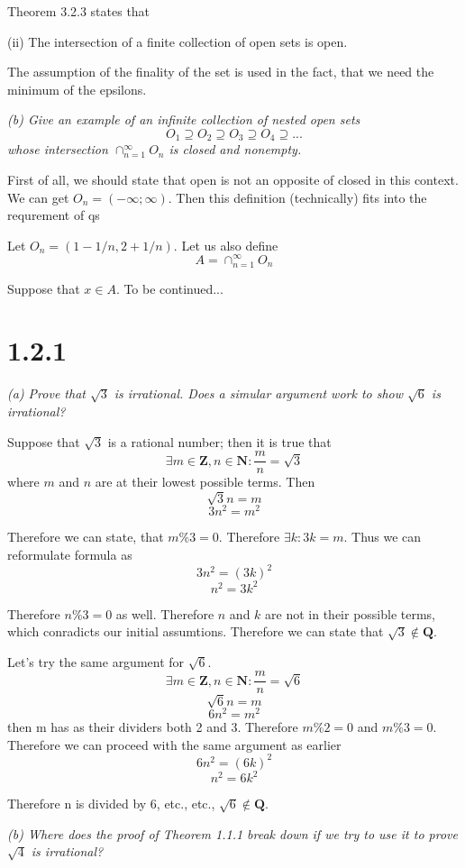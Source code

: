 \documentclass[11pt,oneside,titlepage]{article}
\begin{document}
Theorem 3.2.3 states that

(ii) The intersection of a finite collection of open sets is open.

The assumption of the finality of the set is used in the fact, that we need
the minimum of the epsilons.

\textit{(b) Give an example of an infinite collection of nested open sets}
$$ O_1 \supseteq O_2 \supseteq O_3 \supseteq O_4 \supseteq ... $$
\textit{whose intersection $\cap_{n = 1}^{\infty} O_n$ is closed and nonempty.}

First of all, we should state that open is not an opposite of closed in this
context. We can get $O_n = (-\infty; \infty)$. Then this definition
(technically) fits into the requrement of qs

Let $O_n = (1 - 1/n, 2 + 1/n)$. Let us also define 
$$A = \cap_{n = 1}^{\infty} O_n$$

Suppose that $x \in A$. To be continued...


\section*{1.2.1}
\textit{(a) Prove that $\sqrt{3}$ is irrational. Does a simular argument work
  to show $\sqrt{6}$ is irrational?}

Suppose that $\sqrt{3}$ is a rational number; then it is true that
$$\exists m \in \textbf{Z}, n \in \textbf{N}: \frac{m}{n} = \sqrt{3}$$
where $m$ and $n$ are at their lowest possible terms. Then
$$\sqrt{3}n = m$$
$$3n^2 = m^2$$

Therefore we can state, that $m \% 3 = 0$. Therefore $\exists k: 3k = m$.
Thus we can reformulate formula as
$$3n^2 = (3k)^2$$
$$n^2 = 3k^2$$

Therefore $n\%3 = 0$ as well. Therefore $n$ and $k$ are not in their possible
terms, which conradicts our initial assumtions. Therefore we can state that
$\sqrt{3} \notin \textbf{Q}$.

Let's try the same argument for $\sqrt{6}$.
$$\exists m \in \textbf{Z}, n \in \textbf{N}: \frac{m}{n} = \sqrt{6}$$
$$\sqrt{6}n = m$$
$$6n^2 = m^2$$
then m has as their dividers both 2 and 3. Therefore $m\%2 = 0$ and $m\%3 = 0$.
Therefore we can proceed with the same argument as earlier
$$6n^2 = (6k)^2$$
$$n^2 = 6k^2$$

Therefore n is divided by 6, etc., etc., $\sqrt{6} \notin \textbf{Q}$.

\textit{(b) Where does the proof of Theorem 1.1.1 break down if we try to use
  it to prove $\sqrt{4}$ is irrational? }
\end{document}
